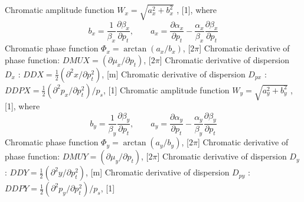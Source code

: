 \begin{madlist}
   Chromatic amplitude function $W_x = \sqrt{a_x^2 + b_x^2}$ ,
         [1], where \\
         \[
         b_x = \frac{1}{\beta_x} \frac{\partial \beta_x}{\partial p_t}  ,\qquad
         a_x = \frac{\partial \alpha_x}{\partial p_t} -
         \frac{\alpha_x}{\beta_x}\frac{\partial \beta_x}{\partial p_t}
         \]
   Chromatic phase function $\Phi_x = \arctan (a_x / b_x)$, [$2 \pi$] 
   Chromatic derivative of phase function: 
  $DMUX = (\partial \mu_x / \partial p_t)$,  [$2 \pi$]
   Chromatic derivative of dispersion $D_x$ :  
  $DDX = \frac{1}{2} (\partial^2 x / \partial p_t^2)$, [m]     
   Chromatic derivative of dispersion $D_{px}$ : 
  $DDPX = \frac{1}{2} ( \partial^2 p_x / \partial p_t^2 ) / p_s $, [1]
   Chromatic amplitude function $W_y = \sqrt{a_y^2 + b_y^2}$ ,
         [1], where \\
         \[
         b_y = \frac{1}{\beta_y} \frac{\partial \beta_y}{\partial p_t} ,\qquad
         a_y = \frac{\partial \alpha_y}{\partial p_t} -
         \frac{\alpha_y}{\beta_y}\frac{\partial \beta_y}{\partial p_t}
         \]
   Chromatic phase function $\Phi_y = \arctan (a_y / b_y)$, [$2 \pi$]
   Chromatic derivative of phase function:
  $DMUY = (\partial \mu_y / \partial p_t)$,  [$2 \pi$] 
   Chromatic derivative of dispersion $D_y$ : 
  $DDY = \frac{1}{2} (\partial^2 y / \partial p_t^2)$, [m]      
   Chromatic derivative of dispersion $D_{py}$ : 
  $DDPY = \frac{1}{2} ( \partial^2 p_y / \partial p_t^2 ) / p_s $, [1] 
\end{madlist}

